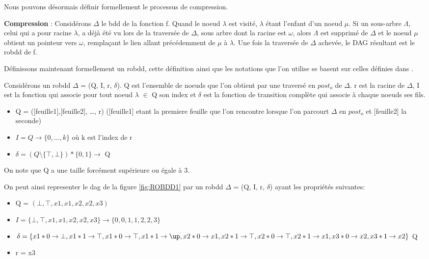 \documentclass[french]{article}
\begin{document}
Nous pouvons désormais définir formellement le processus de compression.
\vspace{5mm}

\textbf{Compression} :  Considérons \(\Delta\) le bdd de la fonction f.  Quand le noeud \(\lambda\) est visité, \(\lambda\) étant l'enfant d'un noeud \(\mu\). Si un sous-arbre \(\Lambda\), celui qui a pour racine \(\lambda\), a déjà été vu lors de la traversée de \(\Delta\), sous arbre dont la racine est \(\omega\), alors \(\Lambda\) est supprimé de \(\Delta\) et le noeud \(\mu\) obtient un pointeur vers \(\omega\), remplaçant le lien allant précédemment de \(\mu\) à \(\lambda\). Une fois la traversée de \(\Delta\) achevée, le DAG résultant est le robdd de f.
\vspace{5mm} 

Définissons maintenant formellement un robdd, cette définition ainsi que les notations que l'on utilise se basent sur celles définies dans \cite{genitrini}.

Considérons un robdd \(\Delta\) = (Q, I, r, \(\delta\)). Q est l'ensemble de noeuds que l'on obtient par une traversé en \(post_{o}\) de \(\Delta\). r est la racine de \(\Delta\), I est la fonction qui associe pour tout noeud \(\lambda\) \(\in\) Q son index et \(\delta\) est la fonction de transition complète qui associe à chaque noeuds ses fils.
\begin{itemize}
    \item
    	Q  =   ([feuille1],[feuille2], …, r)
    	([feuille1] etant la premiere feuille que l'on rencontre lorsque l'on parcourt \(\Delta\) en \(post_{o}\) et [feuille2] la seconde)
    \item 
        \(I = Q   \rightarrow  \{0, \ldots , k\}\) où k est l'index de r
    \item 
       \( \delta = (Q \setminus  \{\top,  \bot\}) * \{0, 1\} \rightarrow \) Q
\end{itemize}

On note que Q a une taille forcément supérieure ou égale à 3.
\vspace{5mm}

On peut ainsi representer le dag de la figure \ref{fig:ROBDD1} par un robdd \(\Delta\) = (Q, I, r, \(\delta\)) ayant les propriétés suivantes:
\begin{itemize}
    \item
    	Q  =   \((\bot, \top, x1,x1,x2,x2,x3)\)
    \item 
        \(I = \{\bot, \top, x1,x1,x2,x2,x3\}   \rightarrow  \{0,0,1,1,2,2,3\}\)
    \item 
       \( \delta = \{ x1 * 0 \rightarrow \bot , x1 * 1 \rightarrow \top, x1 * 0 \rightarrow \top , x1 * 1 \rightarrow \up, x2 * 0 \rightarrow x1, x2 * 1 \rightarrow \top, x2 * 0 \rightarrow \top, x2 * 1 \rightarrow x1, x3 * 0 \rightarrow x2, x3 * 1 \rightarrow x2 \} \) Q
    \item 
        r = x3
\end{itemize}
\end{document}
